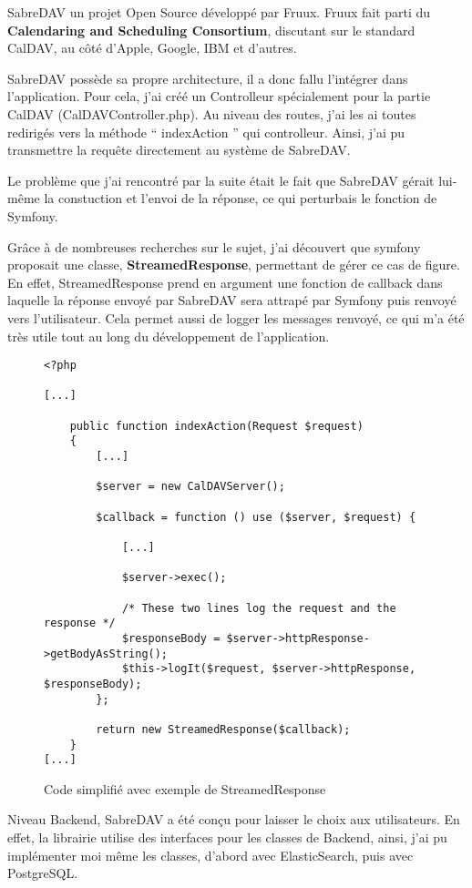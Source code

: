 SabreDAV un projet Open Source développé par Fruux. Fruux fait parti du \textbf{Calendaring and Scheduling Consortium}, discutant sur le standard CalDAV, au côté d'Apple, Google, IBM et d'autres.

SabreDAV possède sa propre architecture, il a donc fallu l'intégrer dans l'application. Pour cela, j'ai créé un Controlleur spécialement pour la partie CalDAV (CalDAVController.php). Au niveau des routes, j'ai les ai toutes redirigés vers la méthode `` indexAction '' qui controlleur. Ainsi, j'ai pu transmettre la requête directement au système de SabreDAV.

Le problème que j'ai rencontré par la suite était le fait que SabreDAV gérait lui-même la constuction et l'envoi de la réponse, ce qui perturbais le fonction de Symfony.

Grâce à de nombreuses recherches sur le sujet, j'ai découvert que symfony proposait une classe, \textbf{StreamedResponse}, permettant de gérer ce cas de figure. En effet, StreamedResponse prend en argument une fonction de callback dans laquelle la réponse envoyé par SabreDAV sera attrapé par Symfony puis renvoyé vers l'utilisateur. Cela permet aussi de logger les messages renvoyé, ce qui m'a été très utile tout au long du développement de l'application.

\begin{figure}[h]
\begin{lstlisting}[frame=single]
<?php

[...]

    public function indexAction(Request $request)
    {
        [...]

        $server = new CalDAVServer();

        $callback = function () use ($server, $request) {

            [...]

            $server->exec();

            /* These two lines log the request and the response */
            $responseBody = $server->httpResponse->getBodyAsString();
            $this->logIt($request, $server->httpResponse, $responseBody);
        };

        return new StreamedResponse($callback);
    }
[...]

\end{lstlisting}
\caption{Code simplifié avec exemple de StreamedResponse}
\end{figure}

Niveau Backend, SabreDAV a été conçu pour laisser le choix aux utilisateurs. En effet, la librairie utilise des interfaces pour les classes de Backend, ainsi, j'ai pu implémenter moi même les classes, d'abord avec ElasticSearch, puis avec PostgreSQL.

